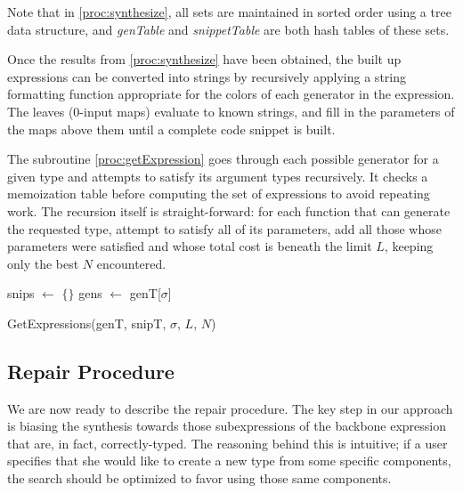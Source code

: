 Note that in \ref{proc:synthesize}, all sets are maintained in sorted order using a tree data structure, and \textit{genTable} and \textit{snippetTable} are both hash tables of these sets.

Once the results from \ref{proc:synthesize} have been obtained, the built up expressions can be converted into strings by recursively applying a string formatting function appropriate for the colors of each generator in the expression. The leaves ($0$-input maps) evaluate to known strings, and fill in the parameters of the maps above them until a complete code snippet is built.

The subroutine \ref{proc:getExpression} goes through each possible generator for a given type and attempts to satisfy its argument types recursively. It checks a memoization table before computing the set of expressions to avoid repeating work. The recursion itself is straight-forward: for each function that can generate the requested type, attempt to satisfy all of its parameters, add all those whose parameters were satisfied and whose total cost is beneath the limit $L$, keeping only the best $N$ encountered.
\begin{procedure}
snips $\leftarrow$ $\{\}$ \; \label{proc:getExpression:snipInit}
gens $\leftarrow$ genT[$\sigma$] \;
\caption{GetExpressions(genT, snipT, $\sigma$, $L$, $N$)}\label{proc:getExpression}
\end{procedure}

\subsection{Repair Procedure}
We are now ready to describe the repair procedure. The key step in our approach is biasing the synthesis towards those subexpressions of the backbone expression that are, in fact, correctly-typed. The reasoning behind this is intuitive; if a user specifies that she would like to create a new type from some specific components, the search should be optimized to favor using those same components.

